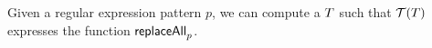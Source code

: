 \begin{proposition}\label{prop-replace-pt}
    Given a regular expression pattern $p$, we can compute a 
    \PT{} $T$ such that $\mathcal{T}(T)$ expresses the function $\mathsf{replaceAll}_p$.
    \label{prop:replaceAll}
\end{proposition}



